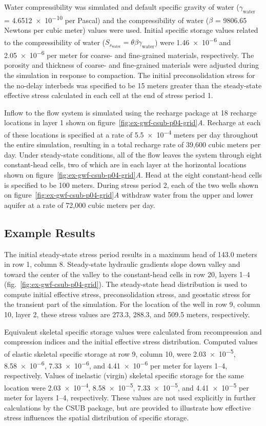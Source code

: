 Water compressibility was simulated and default specific gravity of water ($\gamma_{\text{water}}$ = \num{4.6512e-10} per Pascal) and the compressibility of water ($\beta$ = 9806.65 Newtons per cubic meter) values were used. Initial specific storage values related to the compressibility of water ($S_{s_{\text{water}}} = \theta \beta \gamma_{\text{water}}$) were \num{1.46e-6} and \num{2.05e-6} per meter for coarse- and fine-grained materials, respectively. The porosity and thickness of coarse- and fine-grained materials were adjusted during the simulation in response to compaction. The initial preconsolidation stress for the no-delay interbeds was specified to be 15 meters greater than the steady-state effective stress calculated in each cell at the end of stress period 1. 

Inflow to the flow system is simulated using the recharge package at 18 recharge locations in layer 1 shown on figure~\ref{fig:ex-gwf-csub-p04-grid}\textit{A}. Recharge at each of these locations is specified at a rate of \num{5.5e-4} meters per day throughout the entire simulation, resulting in a total recharge rate of 39,600 cubic meters per day. Under steady-state conditions, all of the flow leaves the system through eight constant-head cells, two of which are in each layer at the horizontal locations shown on figure~\ref{fig:ex-gwf-csub-p04-grid}\textit{A}. Head at the eight constant-head cells is specified to be 100 meters. During stress period 2, each of the two wells shown on figure~\ref{fig:ex-gwf-csub-p04-grid}\textit{A} withdraw water from the upper and lower aquifer at a rate of 72,000 cubic meters per day.

\subsection{Example Results}

The initial steady-state stress period results in a maximum head of 143.0 meters in row 1, column 8. Steady-state hydraulic gradients slope down valley and toward the center of the valley to the constant-head cells in row 20, layers 1–4 (fig.~\ref{fig:ex-gwf-csub-p04-grid}). The steady-state head distribution is used to compute initial effective stress, preconsolidation stress, and geostatic stress for the transient part of the simulation. For the location of the well in row 9, column 10, layer 2, these stress values are 273.3, 288.3, and 509.5 meters, respectively.

Equivalent skeletal specific storage values were calculated from recompression and compression indices and the initial effective stress distribution. Computed values of elastic skeletal specific storage at row 9, column 10, were \num{2.03e-5}, \num{8.58e-6}, \num{7.33e-6}, and \num{4.41e-6} per meter for layers 1--4, respectively. Values of inelastic (virgin) skeletal specific storage for the same location were \num{2.03e-4}, \num{8.58e-5}, \num{7.33e-5}, and \num{4.41e-5} per meter for layers 1--4, respectively. These values are not used explicitly in further calculations by the CSUB package, but are provided to illustrate how effective stress influences the spatial distribution of specific storage.

